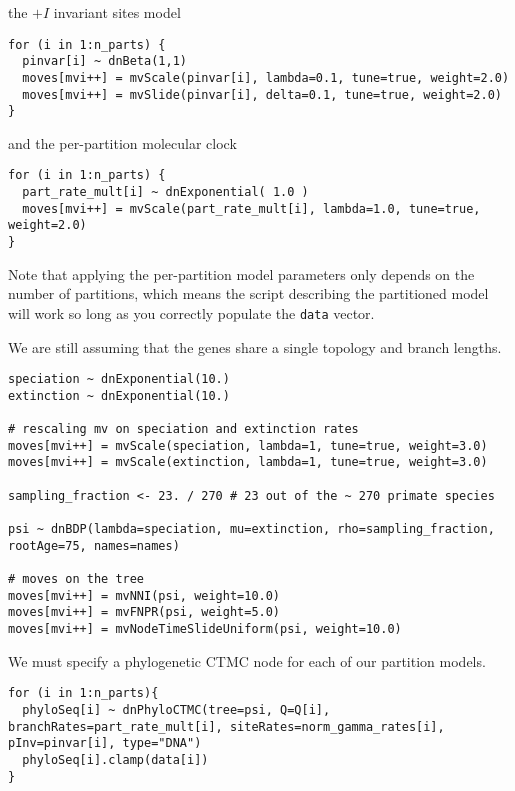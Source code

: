 the $+I$ invariant sites model

{\tt \small \begin{snugshade*}
\begin{lstlisting}
for (i in 1:n_parts) {
  pinvar[i] ~ dnBeta(1,1)
  moves[mvi++] = mvScale(pinvar[i], lambda=0.1, tune=true, weight=2.0)
  moves[mvi++] = mvSlide(pinvar[i], delta=0.1, tune=true, weight=2.0)
}
\end{lstlisting}
\end{snugshade*}}

and the per-partition molecular clock

{\tt \small \begin{snugshade*}
\begin{lstlisting}
for (i in 1:n_parts) {
  part_rate_mult[i] ~ dnExponential( 1.0 )
  moves[mvi++] = mvScale(part_rate_mult[i], lambda=1.0, tune=true, weight=2.0)
}
\end{lstlisting}
\end{snugshade*}}


Note that applying the per-partition model parameters only depends on the number of partitions, which means the script describing the partitioned model will work so long as you correctly populate the {\tt data} vector.

We are still assuming that the genes share a single topology and branch lengths.
{\tt \begin{snugshade*}
\begin{lstlisting}
speciation ~ dnExponential(10.)
extinction ~ dnExponential(10.)

# rescaling mv on speciation and extinction rates
moves[mvi++] = mvScale(speciation, lambda=1, tune=true, weight=3.0)
moves[mvi++] = mvScale(extinction, lambda=1, tune=true, weight=3.0)

sampling_fraction <- 23. / 270 # 23 out of the ~ 270 primate species

psi ~ dnBDP(lambda=speciation, mu=extinction, rho=sampling_fraction, rootAge=75, names=names)

# moves on the tree
moves[mvi++] = mvNNI(psi, weight=10.0)
moves[mvi++] = mvFNPR(psi, weight=5.0)
moves[mvi++] = mvNodeTimeSlideUniform(psi, weight=10.0)
\end{lstlisting}
\end{snugshade*}}

We must specify a phylogenetic CTMC node for each of our partition models.
{\tt \begin{snugshade*}
\begin{lstlisting}
for (i in 1:n_parts){
  phyloSeq[i] ~ dnPhyloCTMC(tree=psi, Q=Q[i], branchRates=part_rate_mult[i], siteRates=norm_gamma_rates[i], pInv=pinvar[i], type="DNA")
  phyloSeq[i].clamp(data[i])
}

\end{lstlisting}
\end{snugshade*}}

